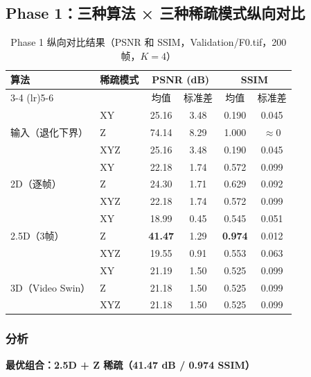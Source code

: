 \documentclass[UTF8, scheme=plain, 11pt, a4paper]{ctexart}
\begin{document}
\subsection{Phase 1：三种算法 × 三种稀疏模式纵向对比}

\begin{table}[H]
  \centering
  \caption{Phase 1 纵向对比结果（PSNR 和 SSIM，Validation/F0.tif，200 帧，$K=4$）}
  \label{tab:phase1}
  \renewcommand{\arraystretch}{1.1}
  \begin{tabular}{llcccc}
    \toprule
    \multirow{2}{*}{\textbf{算法}} & \multirow{2}{*}{\textbf{稀疏模式}} & \multicolumn{2}{c}{\textbf{PSNR (dB)}} & \multicolumn{2}{c}{\textbf{SSIM}} \\
    \cmidrule(lr){3-4} \cmidrule(lr){5-6}
    & & 均值 & 标准差 & 均值 & 标准差 \\
    \midrule
    \multirow{3}{*}{输入（退化下界）}
      & XY  & 25.16 & 3.48 & 0.190 & 0.045 \\
      & Z   & \textcolor{winner}{74.14} & 8.29 & \textcolor{winner}{1.000} & $\approx 0$ \\
      & XYZ & 25.16 & 3.48 & 0.190 & 0.045 \\
    \midrule
    \multirow{3}{*}{2D（逐帧）}
      & XY  & 22.18 & 1.74 & 0.572 & 0.099 \\
      & Z   & 24.30 & 1.71 & 0.629 & 0.092 \\
      & XYZ & 22.18 & 1.74 & 0.572 & 0.099 \\
    \midrule
    \multirow{3}{*}{2.5D（3帧）}
      & XY  & 18.99 & 0.45 & 0.545 & 0.051 \\
      & Z   & \textcolor{winner}{\textbf{41.47}} & 1.29 & \textcolor{winner}{\textbf{0.974}} & 0.012 \\
      & XYZ & 19.55 & 0.91 & 0.553 & 0.063 \\
    \midrule
    \multirow{3}{*}{3D（Video Swin）}
      & XY  & 21.19 & 1.50 & 0.525 & 0.099 \\
      & Z   & 21.18 & 1.50 & 0.525 & 0.099 \\
      & XYZ & 21.18 & 1.50 & 0.525 & 0.099 \\
    \bottomrule
  \end{tabular}
\end{table}

\subsubsection*{分析}

\textbf{最优组合：2.5D + Z 稀疏（41.47 dB / 0.974 SSIM）}
\end{document}
